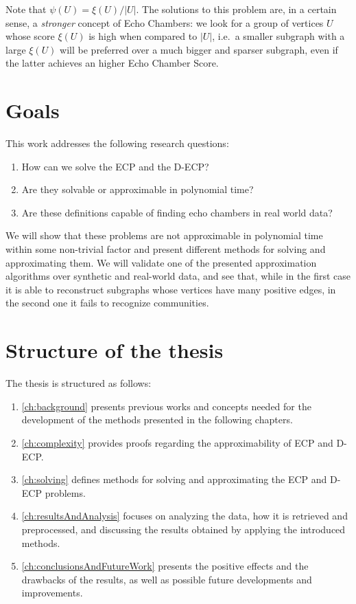Note that $\psi(U) = \xi(U) / |U|$. The solutions to this problem are, in a certain sense, a \emph{stronger} concept of Echo
Chambers: we look for a group of vertices $U$ whose
score $\xi(U)$ is high when compared to $|U|$, i.e.\ a smaller subgraph with a
large $\xi(U)$ will be preferred over a much bigger and sparser subgraph, even
if the latter achieves an higher Echo Chamber Score.

\section{Goals}
\label{sec:goals}

This work addresses the following research questions:

\begin{enumerate}
	\item How can we solve the \acrlong{ECP} and the \acrlong{D-ECP}?
	\item Are they solvable or approximable in polynomial time?
	\item Are these definitions capable of finding echo chambers in real world
	      data?
\end{enumerate}

We will show that these problems are not approximable in polynomial time within
some non-trivial factor and present different methods for solving and
approximating them. We will validate one of the presented approximation
algorithms over synthetic and real-world data, and see that, while in the first
case it is able to reconstruct subgraphs whose vertices have many positive edges, in
the second one it fails to recognize communities.

\section{Structure of the thesis}
\label{sec:structure-thesis}

The thesis is structured as follows:

\begin{enumerate}
	\item \autoref{ch:background} presents previous works and concepts
	      needed for the development of the methods presented in
	      the following chapters.
	\item \autoref{ch:complexity} provides proofs regarding the approximability
	      of \acrshort{ECP} and \acrshort{D-ECP}.
	\item \autoref{ch:solving} defines methods for solving
	      and approximating the \acrshort{ECP} and \acrshort{D-ECP} problems.
	\item \autoref{ch:resultsAndAnalysis} focuses on analyzing the
	      data, how it is retrieved and preprocessed, and discussing the results
	      obtained by applying the introduced methods.
	\item \autoref{ch:conclusionsAndFutureWork} presents the positive effects
	      and the drawbacks of the results, as well as possible future
	      developments and improvements.
\end{enumerate}

